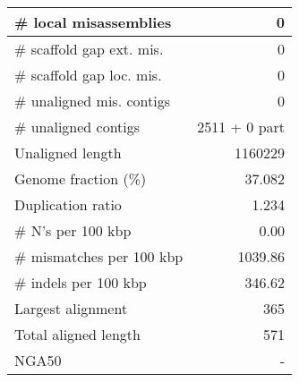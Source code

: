 \documentclass[12pt,a4paper]{article}
\begin{document}
\begin{table}[ht]
\begin{center}
\begin{tabular}{|l*{1}{|r}|}
\# local misassemblies & 0 \\ \hline
\# scaffold gap ext. mis. & 0 \\ \hline
\# scaffold gap loc. mis. & 0 \\ \hline
\# unaligned mis. contigs & 0 \\ \hline
\# unaligned contigs & 2511 + 0 part \\ \hline
Unaligned length & 1160229 \\ \hline
Genome fraction (\%) & 37.082 \\ \hline
Duplication ratio & 1.234 \\ \hline
\# N's per 100 kbp & 0.00 \\ \hline
\# mismatches per 100 kbp & 1039.86 \\ \hline
\# indels per 100 kbp & 346.62 \\ \hline
Largest alignment & 365 \\ \hline
Total aligned length & 571 \\ \hline
NGA50 & - \\ \hline
\end{tabular}
\end{center}
\end{table}
\end{document}
